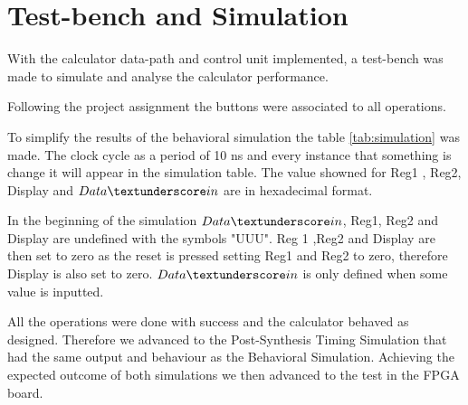 \documentclass[12pt]{article}
\begin{document}
\section{Test-bench and Simulation}
With the calculator data-path and control unit implemented, a test-bench was made to simulate and analyse the calculator performance. 

Following the project assignment the buttons were associated to all operations.

To simplify the results of the behavioral simulation the table \ref{tab:simulation} was made. The clock cycle as a period of 10 ns and every instance that something is change it will appear in the simulation table. The value showned for Reg1 , Reg2, Display and $Data\textunderscore in$ are in hexadecimal format.

In the beginning of the simulation $Data\textunderscore in$, Reg1, Reg2 and Display are undefined with the symbols "UUU". Reg 1 ,Reg2 and Display are then set to zero as the reset is pressed setting Reg1 and Reg2 to zero, therefore Display is also set to zero. $Data\textunderscore in$ is only defined when some value is inputted. 

All the operations were done with success and the calculator behaved as designed. Therefore we advanced to the Post-Synthesis Timing Simulation that had the same output and behaviour as the Behavioral Simulation. Achieving the expected outcome of both simulations we then advanced to the test in the FPGA board.
\end{document}
